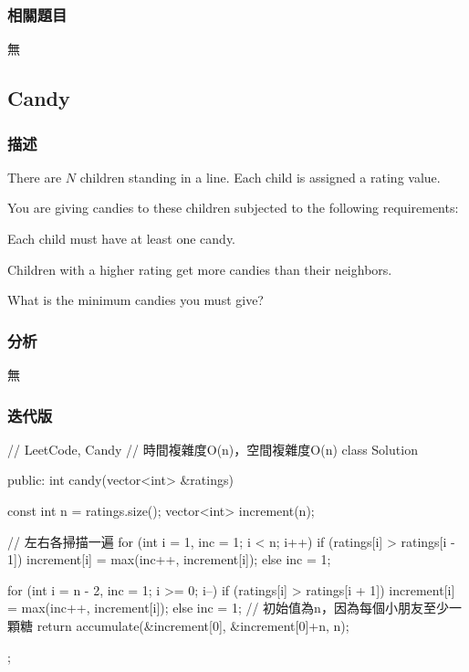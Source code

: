 \subsubsection{相關題目}
\begindot
\item 無
\myenddot


\subsection{Candy} %
\label{sec:candy}


\subsubsection{描述}
There are $N$ children standing in a line. Each child is assigned a rating value.

You are giving candies to these children subjected to the following requirements:
\begindot
\item Each child must have at least one candy.
\item Children with a higher rating get more candies than their neighbors.
\myenddot

What is the minimum candies you must give?


\subsubsection{分析}
無


\subsubsection{迭代版}
\begin{Code}
// LeetCode, Candy
// 時間複雜度O(n)，空間複雜度O(n)
class Solution {
public:
    int candy(vector<int> &ratings) {
        const int n = ratings.size();
        vector<int> increment(n);

        // 左右各掃描一遍
        for (int i = 1, inc = 1; i < n; i++) {
            if (ratings[i] > ratings[i - 1])
                increment[i] = max(inc++, increment[i]);
            else
                inc = 1;
        }

        for (int i = n - 2, inc = 1; i >= 0; i--) {
            if (ratings[i] > ratings[i + 1])
                increment[i] = max(inc++, increment[i]);
            else
                inc = 1;
        }
        // 初始值為n，因為每個小朋友至少一顆糖
        return accumulate(&increment[0], &increment[0]+n, n);
    }
};
\end{Code}


